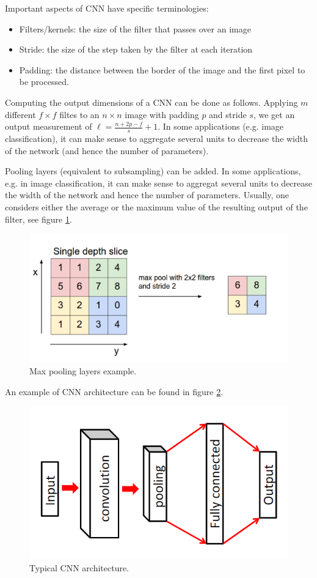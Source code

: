 \documentclass[a4paper,10pt,twoside]{article}
\begin{document}
Important aspects of CNN have specific terminologies:
\begin{itemize}
    \item Filters/kernels: the size of the filter that passes over an image
    \item Stride: the size of the step taken by the filter at each iteration
    \item Padding: the distance between the border of the image and the first pixel to be processed. 
\end{itemize}

Computing the output dimensions of a CNN can be done as follows. Applying $m$ different $f\times f$ filtes to an $n\times n$ image with padding $p$ and stride $s$, we get an output measurement of $\ell=\frac{n+2p-f}{s}+1$. In some applications (e.g. image classification), it can make sense to aggregate several units to decrease the width of the network (and hence the number of parameters). 

Pooling layers (equivalent to subsampling) can be added. In some applications, e.g. in image classification, it can make sense to aggregat several units to decrease the width of the network and hence the number of parameters. Usually, one considers either the average or the maximum value of the resulting output of the filter, see figure \ref{max-pooling-layers}.

\begin{figure}
    \centering
    \includegraphics[width=.5\textwidth]{figures/max-pooling-layers.png}
    \caption{Max pooling layers example.}
    \label{max-pooling-layers}
\end{figure}

An example of CNN architecture can be found in figure \ref{cnn-arch}.

\begin{figure}
    \centering
    \includegraphics[width=.5\textwidth]{figures/cnn-arch.png}
    \caption{Typical CNN architecture.}
    \label{cnn-arch}
\end{figure}
\end{document}

